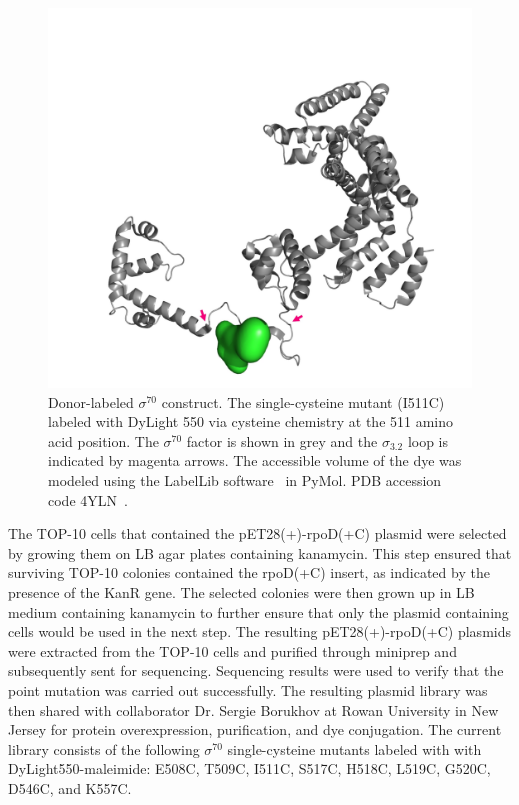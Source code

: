 \begin{figure}
    \centering
    \includegraphics[width=\textwidth]{chapters/figures/sigma_3-2_loop_donor-dye.jpg}
    \caption{\label{fig:sigma_3-2_loop_donor-dye} 
    Donor-labeled $\sigma^{70}$ construct.
    The single-cysteine mutant (I511C) labeled with DyLight 550 via cysteine chemistry at the 511 amino acid position.
    The $\sigma^{70}$ factor is shown in grey and the $\sigma_{3.2}$ loop is indicated by magenta arrows.
    The accessible volume of the dye was modeled using the LabelLib software~\cite{dimura_NatComm_2020} in PyMol.
    PDB accession code 4YLN~\cite{zuo_steitz_2015}.
    }
\end{figure}

The TOP-10 cells that contained the pET28(+)-rpoD(+C) plasmid were selected by growing them on LB agar plates containing kanamycin. 
This step ensured that surviving TOP-10 colonies contained the rpoD(+C) insert, as indicated by the presence of the KanR gene. 
The selected colonies were then grown up in LB medium containing kanamycin to further ensure that only the plasmid containing cells would be used in the next step. 
The resulting pET28(+)-rpoD(+C) plasmids were extracted from the TOP-10 cells and purified through miniprep and subsequently sent for sequencing.
Sequencing results were used to verify that the point mutation was carried out successfully. 
The resulting plasmid library was then shared with collaborator Dr. Sergie Borukhov at Rowan University in New Jersey for protein overexpression, purification, and dye conjugation.
The current library consists of the following $\sigma^{70}$ single-cysteine mutants labeled with with DyLight550-maleimide: E508C, T509C, I511C, S517C, H518C, L519C, G520C, D546C, and K557C.


